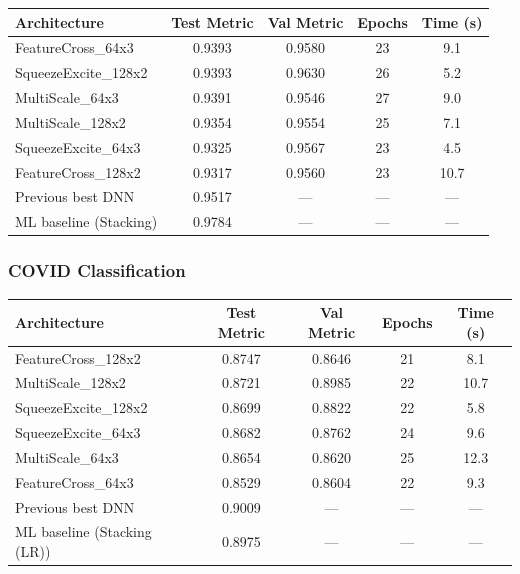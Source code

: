 \documentclass[11pt,a4paper]{article}
\begin{document}
\begin{center}
\small
\begin{tabular}{lcccc}
\toprule
\textbf{Architecture} & \textbf{Test Metric} & \textbf{Val Metric} & \textbf{Epochs} & \textbf{Time (s)} \\
\midrule
FeatureCross\_64x3 & 0.9393 & 0.9580 & 23 & 9.1 \\
SqueezeExcite\_128x2 & 0.9393 & 0.9630 & 26 & 5.2 \\
MultiScale\_64x3 & 0.9391 & 0.9546 & 27 & 9.0 \\
MultiScale\_128x2 & 0.9354 & 0.9554 & 25 & 7.1 \\
SqueezeExcite\_64x3 & 0.9325 & 0.9567 & 23 & 4.5 \\
FeatureCross\_128x2 & 0.9317 & 0.9560 & 23 & 10.7 \\
\midrule
Previous best DNN & 0.9517 & --- & --- & --- \\
ML baseline (Stacking) & 0.9784 & --- & --- & --- \\
\bottomrule
\end{tabular}
\end{center}

\subsubsection*{COVID Classification}

\begin{center}
\small
\begin{tabular}{lcccc}
\toprule
\textbf{Architecture} & \textbf{Test Metric} & \textbf{Val Metric} & \textbf{Epochs} & \textbf{Time (s)} \\
\midrule
FeatureCross\_128x2 & 0.8747 & 0.8646 & 21 & 8.1 \\
MultiScale\_128x2 & 0.8721 & 0.8985 & 22 & 10.7 \\
SqueezeExcite\_128x2 & 0.8699 & 0.8822 & 22 & 5.8 \\
SqueezeExcite\_64x3 & 0.8682 & 0.8762 & 24 & 9.6 \\
MultiScale\_64x3 & 0.8654 & 0.8620 & 25 & 12.3 \\
FeatureCross\_64x3 & 0.8529 & 0.8604 & 22 & 9.3 \\
\midrule
Previous best DNN & 0.9009 & --- & --- & --- \\
ML baseline (Stacking (LR)) & 0.8975 & --- & --- & --- \\
\bottomrule
\end{tabular}
\end{center}
\end{document}
